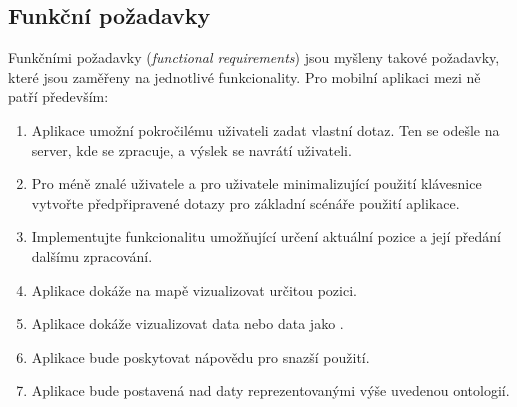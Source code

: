 \subsection{Funkční požadavky}
Funkčními požadavky (\textit{functional requirements}) jsou myšleny takové požadavky, které jsou zaměřeny na jednotlivé funkcionality. Pro mobilní aplikaci mezi ně patří především:

\begin{enumerate}
 \item Aplikace umožní pokročilému uživateli zadat vlastní  dotaz. Ten se odešle na server, kde se zpracuje, a výslek se navrátí uživateli.
 \item Pro méně znalé uživatele  a pro uživatele minimalizující použití klávesnice vytvořte předpřipravené dotazy pro základní scénáře použití aplikace.
 \item Implementujte funkcionalitu umožňující určení aktuální pozice a její předání dalšímu zpracování.
 \item Aplikace dokáže na mapě vizualizovat určitou pozici.
 \item Aplikace dokáže vizualizovat  data nebo data jako .
 \item Aplikace bude poskytovat nápovědu pro snazší použití.
 \item Aplikace bude postavená nad daty reprezentovanými výše uvedenou ontologií.
\end{enumerate}

